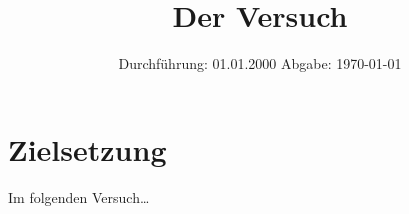 

\subject{V123} %
\title{Der Versuch} %
\date{
    Durchführung: 01.01.2000 %
     \hspace{3em}
    Abgabe: \today %
}


\maketitle
\thispagestyle{empty}
\tableofcontents
\newpage

\section{Zielsetzung}

    Im folgenden Versuch… %


\clearpage


\clearpage


\clearpage


\clearpage

\printbibliography


